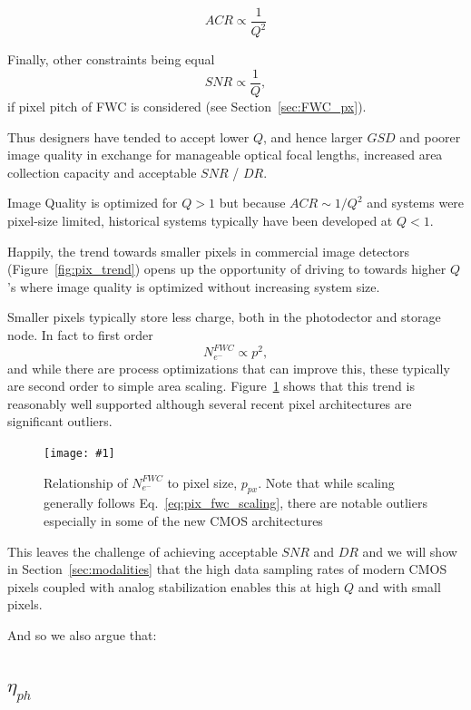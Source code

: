 \documentclass[10pt,journal]{IEEEtran}  %
\newcommand{\includefigure}[3]
{
  \begin{figure}[h!]
  \centering
  \texttt{[image: \#1]}
  \caption[]{#3}
  \label{#2}
  \end{figure}
}
\begin{document}
\begin{equation}
    ACR \propto \frac{1}{Q^2}
\end{equation}

Finally, other constraints being equal
\begin{equation}
    SNR \propto \frac{1}{Q},
\end{equation}
if pixel pitch of FWC is considered (see Section~\ref{sec:FWC_px}).

Thus designers have tended to accept lower $Q$, and hence larger $GSD$ and poorer image quality in exchange for manageable optical focal lengths, increased area collection capacity and acceptable $SNR$ / $DR$.

\begin{observation}[$Q > 1$]
Image Quality is optimized for $Q>1$ but because $ACR \sim 1/Q^2$ and systems were pixel-size limited, historical systems typically have been developed at $Q<1$.
\end{observation}

Happily, the trend towards smaller pixels in commercial image detectors (Figure~\ref{fig:pix_trend}) opens up the opportunity of driving to towards higher $Q$'s where image quality is optimized without increasing system size.

Smaller pixels typically store less charge, both in the photodector and storage node. In fact to first order~\cite{jerram}
\begin{equation}
  \label{eq:pix_fwc_scaling}  
N_{e^-}^{FWC} \propto p^2,
\end{equation}
and while there are process optimizations that can improve this, these typically are second order to simple area scaling.  Figure~\ref{fig:p_fwc} shows that this trend is reasonably well supported although several recent pixel architectures are significant outliers.

\includefigure{figures/p_fwc.pgf}{fig:p_fwc}{Relationship of $N_{e^-}^{FWC}$ to pixel size, $p_{px}$.  Note that while scaling generally follows Eq.~\eqref{eq:pix_fwc_scaling}, there are notable outliers especially in some of the new CMOS architectures}

This leaves the challenge of achieving acceptable $SNR$ and $DR$ and we will show in Section~\ref{sec:modalities} that the high data sampling rates of modern CMOS pixels coupled with analog stabilization enables this at high $Q$ and with small pixels.

And so we also argue that:

\subsection{$\eta_{ph}$}
\label{sec:eta_ph}
\end{document}
